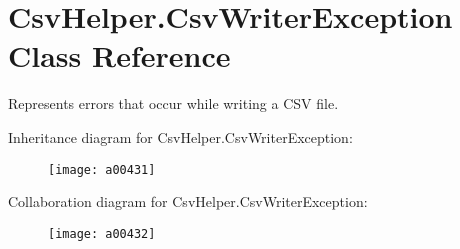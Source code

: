 \hypertarget{a00072}{\section{Csv\-Helper.\-Csv\-Writer\-Exception Class Reference}
\label{a00072}
}


Represents errors that occur while writing a C\-S\-V file.  




Inheritance diagram for Csv\-Helper.\-Csv\-Writer\-Exception\-:
\nopagebreak
\begin{figure}[H]
\begin{center}
\leavevmode
\texttt{[image: a00431]}
\end{center}
\end{figure}


Collaboration diagram for Csv\-Helper.\-Csv\-Writer\-Exception\-:
\nopagebreak
\begin{figure}[H]
\begin{center}
\leavevmode
\texttt{[image: a00432]}
\end{center}
\end{figure}
